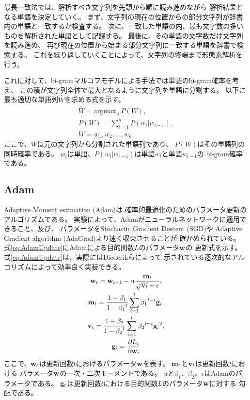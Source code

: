 最長一致法では、解析すべき文字列を先頭から順に読み進めながら
解析結果となる単語を決定していく。
まず、文字列の現在の位置からの部分文字列が辞書内の単語と一致するか検査する。
次に、一致した単語の内、最も文字数の多いものを解析された単語として記録する。
最後に、その単語の文字数だけ文字列を読み進め、
再び現在の位置から始まる部分文字列に一致する単語を辞書で検索する。
これを繰り返していくことによって、文字列の終端まで形態素解析を行う。

これに対して、bi-gramマルコフモデルによる手法では単語のbi-gram確率を考え、
この積が文字列全体で最大となるように文字列を単語に分割する。
以下に最も適切な単語列$\hat{W}$を求める式を示す。
\begin{gather}
  \hat{W} = \text{argmax}_{W} P(W), \\
  P(W) = \sum^{n}_{i = 1} P(w_i | w_{i - 1}), \nonumber \\
  W = w_1, w_2, ... , w_n \nonumber
\end{gather}
ここで、$W$は元の文字列から分割された単語列であり、
$P(W)$はその単語列の同時確率である。
$w_i$は単語、$P(w_i | w_{i - 1})$は単語$w_i$と単語$w_{i - 1}$の
bi-gram確率である。


\subsection{Adam} \label{ssec:Adam}

Adaptive Moment estimation (Adam)\cite{diederik15}は
確率的最適化のためのパラメータ更新のアルゴリズムである。
実験によって、Adamがニューラルネットワークに適用できること、及び、
パラメータをStochastic Gradient Descent (SGD)や
Adaptive Gradient algorithm (AdaGrad)\cite{john12}より速く収束させることが
確かめられている。
式\ref{eq:AdamUpdate}にAdamによる目的関数$L$のパラメータ$\mathbf{w}$の
更新式を示す。
式\ref{eq:AdamUpdate}は、実際にはDiederikら\cite{diederik15}によって
示されている逐次的なアルゴリズムによって効率良く実装できる。
\begin{gather} \label{eq:AdamUpdate}
  \mathbf{w}_t = \mathbf{w}_{t - 1}
                 - \alpha \frac{\mathbf{m}_t}
                               {\sqrt{\mathbf{v}_t} + \epsilon}, \\
  \mathbf{m}_t = \frac{1 - \beta_1}{1 - {\beta_1}^t}
                 \sum^t_{i = 1} {\beta_1}^{t - i} \mathbf{g}_i, \nonumber \\
  \mathbf{v}_t = \frac{1 - \beta_2}{1 - {\beta_2}^t}
                 \sum^t_{i = 1} {\beta_2}^{t - i} {\mathbf{g}_i}^2, \nonumber \\
  \mathbf{g}_i = \frac{\partial L_i}{\partial \mathbf{w}_i} \nonumber
\end{gather}
ここで、$\mathbf{w}_t$は更新回数$t$におけるパラメータ$\mathbf{w}$を表す。
$\mathbf{m}_t$と$\mathbf{v}_t$は更新回数$t$における
パラメータ$\mathbf{w}$の一次・二次モーメントである。
$\alpha$と$\beta_1$、$\beta_2$、$\epsilon$はAdamのパラメータである。
$\mathbf{g}_t$は更新回数$t$における目的関数$L$のパラメータ$\mathbf{w}$に対する
勾配である。

